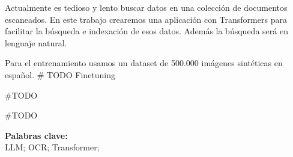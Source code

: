 \documentclass[../main.tex]{subfiles}
\begin{document}

Actualmente es tedioso y lento buscar datos en una colección de documentos escaneados.
En este trabajo crearemos una aplicación con Transformers para facilitar la búsqueda e indexación de esos datos.
Además la búsqueda será en lenguaje natural.

Para el entrenamiento usamos un dataset de 500.000 imágenes sintéticas en español.
\# TODO Finetuning

\#TODO

\#TODO

%
%

\noindent \textbf{Palabras clave:}\\
\noindent LLM; OCR; Transformer;
\end{document}
